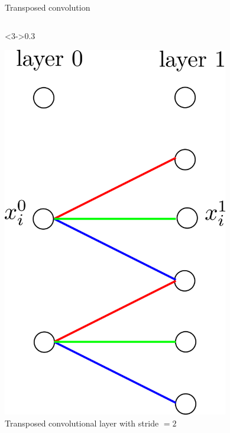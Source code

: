 \documentclass[xcolor=pdftex,dvipsnames,table,mathserif]{beamer}
\newcommand{\source}[1]{\begin{textblock*}{4cm}(8.7cm,8.6cm)
    \begin{beamercolorbox}[ht=0.5cm,right]{framesource}
      \usebeamerfont{framesource}\usebeamercolor[fg]{framesource} Credits: {#1}
    \end{beamercolorbox}
\end{textblock*}}
\begin{document}
\begin{frame}{Transposed convolution}
\begin{columns}
    \begin{column}<3->{0.3\textwidth}
      \begin{center}
        \includegraphics[width=0.74\textwidth]{transposed_conv_stride.png}
        \\ \scriptsize{Transposed convolutional layer with stride $=2$}
      \end{center}
    \end{column}

  \end{columns}


\end{frame}



\end{document}
